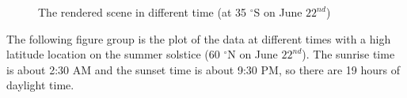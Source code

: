 \documentclass{article}
\begin{document}
\begin{figure}[h]
  \hfill
  \hfill

  \caption{The rendered scene in different time (at 35 $^{\circ}$S on June \(22^{nd}\))}
  \label{fig:AllL35S}
\end{figure}

The following figure group is the plot of the data at different times with a high latitude location on the summer 
solstice (60 $^{\circ}$N on June \(22^{nd}\)). The sunrise time is about 2:30 AM and the sunset time is about 9:30 
PM, so there are 19 hours of daylight time.
\end{document}
